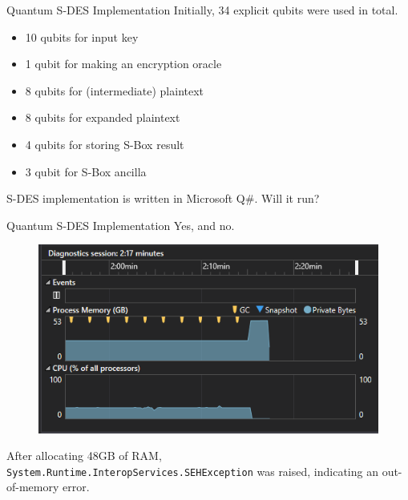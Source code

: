 \documentclass{beamer}
\begin{document}
    \begin{frame}{Quantum S-DES Implementation}
        Initially, 34 explicit qubits were used in total.
        \begin{itemize}
            \item 10 qubits for input key
            \item 1 qubit for making an encryption oracle
            \item 8 qubits for (intermediate) plaintext
            \item 8 qubits for expanded plaintext
            \item 4 qubits for storing S-Box result
            \item 3 qubit for S-Box ancilla
        \end{itemize}
        S-DES implementation is written in Microsoft Q\#. Will it run?
    \end{frame}

    \begin{frame}{Quantum S-DES Implementation}
        Yes, and no.
        \begin{figure}[h]
            \centering
            \includegraphics[height=0.5\textheight]{./Images/Qsharp-SDES-memory-error-2.png}
        \end{figure}
        After allocating 48GB of RAM, \texttt{System.Runtime.InteropServices.SEHException} was raised, indicating an out-of-memory error.
    \end{frame}
\end{document}
